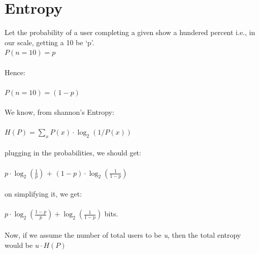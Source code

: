 \documentclass{article}
\begin{document}
\section{Entropy}
Let the probability of a user completing a given show a hundered percent i.e., in our scale, getting a 10 be `p'.\\
$P(n = 10) = p$\\
\\
Hence:\\
\\
$P(n \!= 10) = (1 - p)$\\
\\
We know, from shannon's Entropy:\\
\\
$H(P) = \sum_{x} P(x) \cdot \log_2 (1/P(x))$\\
\\
plugging in the probabilities, we should get:\\
\\
$p \cdot \log_2 (\frac{1}{p})$ $ + $ $ (1 - p) \cdot \log_2 (\frac{1}{1 - p})$\\
\\
on simplifying it, we get:\\
\\
$p \cdot \log_2 (\frac{1 - p}{p}) + \log_2 (\frac{1}{1 - p})$ bits.\\
\\
Now, if we assume the number of total users to be \textit{u}, then the total entropy would be $ u \cdot H(P)$\\
\\
\end{document}
